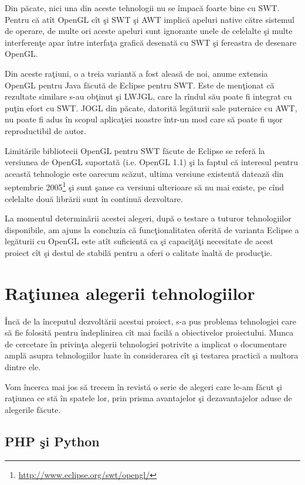 Din păcate, nici una din aceste tehnologii nu se împacă foarte bine cu SWT. 
Pentru că atît OpenGL cît şi SWT şi AWT implică apeluri native către sistemul 
de operare, de multe ori aceste apeluri sunt ignorante unele de celelalte şi 
multe interferenţe apar între interfaţa grafică desenată cu SWT şi fereastra de 
desenare OpenGL.

Din aceste raţiuni, o a treia variantă a fost aleasă de noi, anume extensia 
OpenGL pentru Java făcută de Eclipse pentru SWT. Este de menţionat că rezultate 
similare s-au obţinut şi LWJGL, care la rîndul său poate fi integrat cu puţin 
efort cu SWT. JOGL din păcate, datorită legăturii sale puternice cu AWT, nu 
poate fi adus în scopul aplicaţiei noastre într-un mod care să poate fi uşor 
reproductibil de autor.

Limitările bibliotecii OpenGL pentru SWT făcute de Eclipse se referă la 
versiunea de OpenGL suportată (i.e. OpenGL 1.1) şi la faptul că interesul 
pentru această tehnologie este oarecum scăzut, ultima versiune existentă 
datează din septembrie 2005\footnote{\url{http://www.eclipse.org/swt/opengl/}} 
şi sunt şanse ca versiuni ulterioare să nu mai existe, pe cînd celelalte două 
librării sunt în continuă dezvoltare.

La momentul determinării acestei alegeri, după o testare a tuturor 
tehnologiilor disponibile, am ajuns la concluzia că funcţionalitatea oferită de 
varianta Eclipse a legăturii cu OpenGL este atît suficientă ca şi capaciţăţi 
necesitate de acest proiect cît şi destul de stabilă pentru a oferi o calitate 
înaltă de producţie.

\section{Raţiunea alegerii tehnologiilor}

Încă de la începutul dezvoltării acestui proiect, s-a pus problema tehnologiei 
care să fie folosită pentru îndeplinirea cît mai facilă a obiectivelor 
proiectului. Munca de cercetare în privinţa alegerii tehnologiei potrivite a 
implicat o documentare amplă asupra tehnologiilor luate în considerarea cît şi 
testarea practică a multora dintre ele.

Vom încerca mai jos să trecem în revistă o serie de alegeri care le-am făcut şi 
raţiunea ce stă în spatele lor, prin prisma avantajelor şi dezavantajelor aduse 
de alegerile făcute.

\subsection{PHP şi Python}

